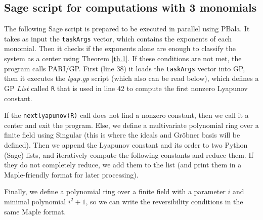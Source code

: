 \begin{appendices}



\section{Sage script for computations with 3 monomials}

The following Sage script is prepared to be executed in parallel using PBala. It takes as input the \texttt{taskArgs} vector, which contains the exponents of each monomial. Then it checks if the exponents alone are enough to classify the system as a center using Theorem \ref{th.1}. If these conditions are not met, the program calls PARI/GP. First (line 38) it loads the \texttt{taskArgs} vector into GP, then it executes the \emph{lyap.gp} script (which also can be read below), which defines a GP \emph{List} called \texttt{R} that is used in line 42 to compute the first nonzero Lyapunov constant.

If the \texttt{nextlyapunov(R)} call does not find a nonzero constant, then we call it a center and exit the program. Else, we define a multivariate polynomial ring over a finite field using Singular (this is where the ideals and Gröbner basis will be defined). Then we append the Lyapunov constant and its order to two Python (Sage) lists, and iteratively compute the following constants and reduce them. If they do not completely reduce, we add them to the list (and print them in a Maple-friendly format for later processing).

Finally, we define a polynomial ring over a finite field with a parameter $i$ and minimal polynomial $i^2+1$, so we can write the reversibility conditions in the same Maple format.













\end{appendices}
